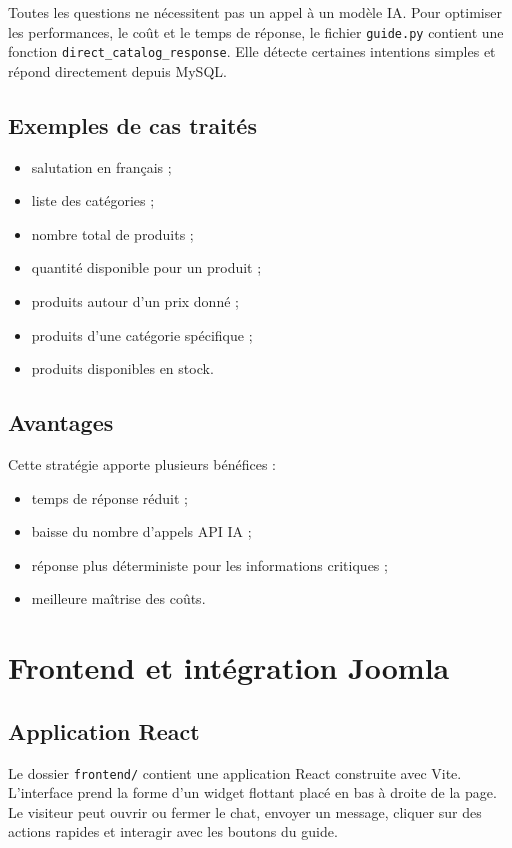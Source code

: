 \documentclass[12pt,a4paper]{report}
\begin{document}
Toutes les questions ne nécessitent pas un appel à un modèle IA. Pour optimiser les performances, le coût et le temps de réponse, le fichier \texttt{guide.py} contient une fonction \texttt{direct\_catalog\_response}. Elle détecte certaines intentions simples et répond directement depuis MySQL.

\section{Exemples de cas traités}

\begin{itemize}
    \item salutation en français ;
    \item liste des catégories ;
    \item nombre total de produits ;
    \item quantité disponible pour un produit ;
    \item produits autour d'un prix donné ;
    \item produits d'une catégorie spécifique ;
    \item produits disponibles en stock.
\end{itemize}

\section{Avantages}

Cette stratégie apporte plusieurs bénéfices :

\begin{itemize}
    \item temps de réponse réduit ;
    \item baisse du nombre d'appels API IA ;
    \item réponse plus déterministe pour les informations critiques ;
    \item meilleure maîtrise des coûts.
\end{itemize}

\chapter{Frontend et intégration Joomla}

\section{Application React}

Le dossier \texttt{frontend/} contient une application React construite avec Vite. L'interface prend la forme d'un widget flottant placé en bas à droite de la page. Le visiteur peut ouvrir ou fermer le chat, envoyer un message, cliquer sur des actions rapides et interagir avec les boutons du guide.
\end{document}

